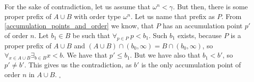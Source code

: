 
For the sake of contradiction, let us assume that $\omega^n < \gamma$. But then, 
there is some proper prefix of $A\cup B$ with order type $\omega^n$. Let us name that 
prefix as $P$. From \ref{accumulation_points_and_order} we know, that 
$P$ has an accumulation point $p'$ of order $n$. 
Let $b_1 \in B$ be such that $\forall_{p \in P}\ p<b_1$. Such $b_1$ exists, because $P$ is 
a proper prefix of $A\cup B$ and $(A\cup B) \cap (b_0,\infty) = B \cap (b_0, \infty)$, so 
$\forall_{x \in A\cup B}\exists_{b \in B} x < b$.
We have that $p' \leq b_1$. But we have also that $b_1 < b'$, so $p' \neq b'$. This gives us the 
contradiction, as $b'$ is the only accumulation point of order $n$ in $A\cup B$. $_\square$






